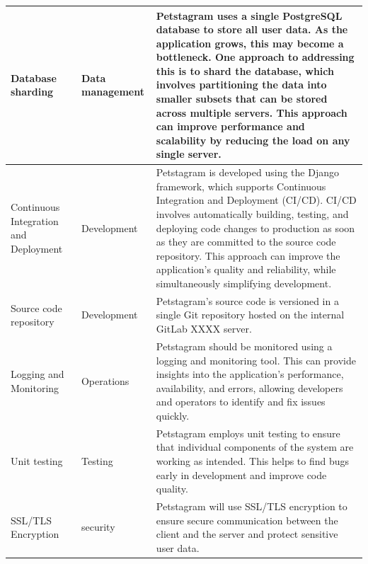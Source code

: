 \documentclass[lettersize,journal]{IEEEtran}
\begin{document}
\begin{table}[htbp]
\begin{tabular}{ |m{3cm}|m{2cm}|m{11cm}| }
        \hline
        Database sharding&Data management&Petstagram uses a single PostgreSQL database to store all user data. As the application grows, this may become a bottleneck. One approach to addressing this is to shard the database, which involves partitioning the data into smaller subsets that can be stored across multiple servers. This approach can improve performance and scalability by reducing the load on any single server.\\
        \hline
        Continuous Integration and Deployment&Development&Petstagram is developed using the Django framework, which supports Continuous Integration and Deployment (CI/CD). CI/CD involves automatically building, testing, and deploying code changes to production as soon as they are committed to the source code repository. This approach can improve the application's quality and reliability, while simultaneously simplifying development.\\
        \hline
        Source code repository&Development&Petstagram’s source code is versioned in a single Git repository hosted on the internal GitLab XXXX server.\\
        \hline
        Logging and Monitoring&Operations&Petstagram should be monitored using a logging and monitoring tool. This can provide insights into the application's performance, availability, and errors, allowing developers and operators to identify and fix issues quickly. \\
        \hline
        Unit testing&Testing&Petstagram employs unit testing to ensure that individual components of the system are working as intended. This helps to find bugs early in development and improve code quality.\\
        \hline
        SSL/TLS Encryption&security&Petstagram will use SSL/TLS encryption to ensure secure communication between the client and the server and protect sensitive user data.\\
        \hline
    \end{tabular}
    \\
\end{table}


\vfill
\end{document}
